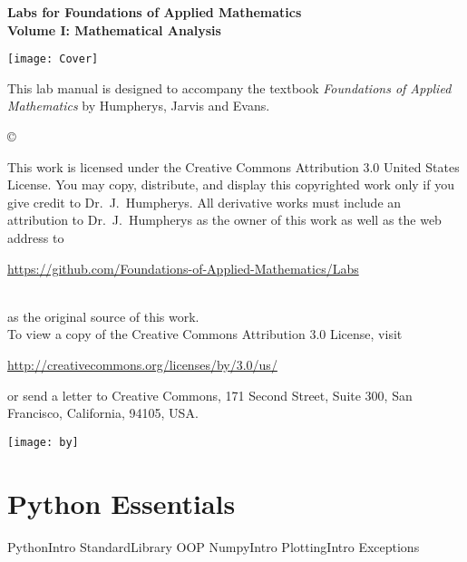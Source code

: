 \documentclass[nociteref]{SIAM-GH-book}
\begin{document}

\thispagestyle{empty} %

\begin{center}
{\huge \bf Labs for Foundations of Applied Mathematics} \\
\vspace{5mm}
{\Large \bf Volume I: Mathematical Analysis}
\vspace{20mm}

\texttt{[image: Cover]}
\end{center}
\frontmatter



\begin{thepreface} %

This lab manual is designed to accompany the textbook \emph{Foundations of Applied Mathematics} by Humpherys, Jarvis and Evans.

\vfill
\copyright{This work is licensed under the Creative Commons Attribution 3.0 United States
License.  You may copy, distribute, and display this copyrighted work only if you give
credit to Dr.~J.~Humpherys. All derivative works must include an attribution to Dr.~J.~Humpherys as the owner of this work as well as the web address to
\\\centerline{\url{https://github.com/Foundations-of-Applied-Mathematics/Labs}}\\as the original source of this work.
\\To view a copy of the Creative Commons Attribution 3.0 License, visit
\\\centerline{\url{http://creativecommons.org/licenses/by/3.0/us/}} or send a letter to Creative Commons, 171 Second Street, Suite 300, San Francisco, California, 94105, USA.}

\vfill
\centering\texttt{[image: by]}
\vfill
\end{thepreface}

\setcounter{tocdepth}{1}
\tableofcontents

\mainmatter %

\part{Python Essentials} %
{PythonIntro}
{StandardLibrary}
{OOP}
{NumpyIntro}
{PlottingIntro}
{Exceptions}
\end{document}
